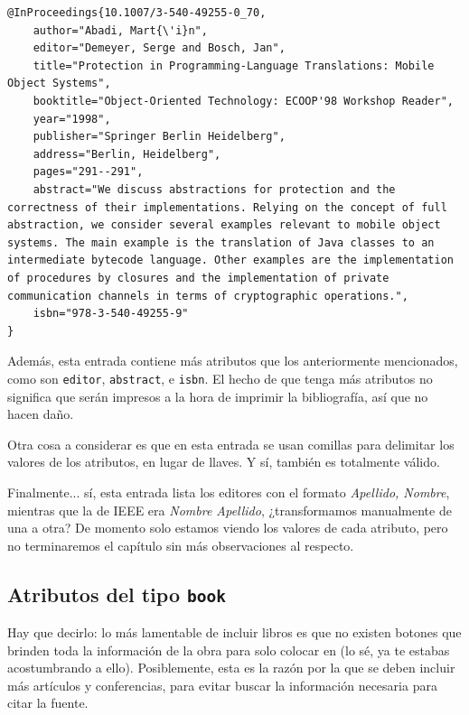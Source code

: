 \begin{lstlisting}[style=bibtex,caption={Entrada de un artículo de Springer.},label=lst:bibtex_springer]
@InProceedings{10.1007/3-540-49255-0_70,
	author="Abadi, Mart{\'i}n",
	editor="Demeyer, Serge and Bosch, Jan",
	title="Protection in Programming-Language Translations: Mobile Object Systems",
	booktitle="Object-Oriented Technology: ECOOP'98 Workshop Reader",
	year="1998",
	publisher="Springer Berlin Heidelberg",
	address="Berlin, Heidelberg",
	pages="291--291",
	abstract="We discuss abstractions for protection and the correctness of their implementations. Relying on the concept of full abstraction, we consider several examples relevant to mobile object systems. The main example is the translation of Java classes to an intermediate bytecode language. Other examples are the implementation of procedures by closures and the implementation of private communication channels in terms of cryptographic operations.",
	isbn="978-3-540-49255-9"
}
\end{lstlisting}

Además, esta entrada contiene más atributos que los anteriormente mencionados, como son \texttt{editor}, \texttt{abstract}, e \texttt{isbn}. El hecho de que tenga más atributos no significa que serán impresos a la hora de imprimir la bibliografía, así que no hacen daño.

Otra cosa a considerar es que en esta entrada se usan comillas para delimitar los valores de los atributos, en lugar de llaves. Y sí, también es totalmente válido.

Finalmente... sí, esta entrada lista los editores con el formato \emph{Apellido, Nombre}, mientras que la de IEEE era \emph{Nombre Apellido}, ¿transformamos manualmente de una a otra? De momento solo estamos viendo los valores de cada atributo, pero no terminaremos el capítulo sin más observaciones al respecto.



\subsection{Atributos del tipo \texttt{book}}



Hay que decirlo: lo más lamentable de incluir libros es que no existen botones que brinden toda la información de la obra para solo colocar en \BibTeX{} (lo sé, ya te estabas acostumbrando a ello). Posiblemente, esta es la razón por la que se deben incluir más artículos y conferencias, para evitar buscar la información necesaria para citar la fuente.

